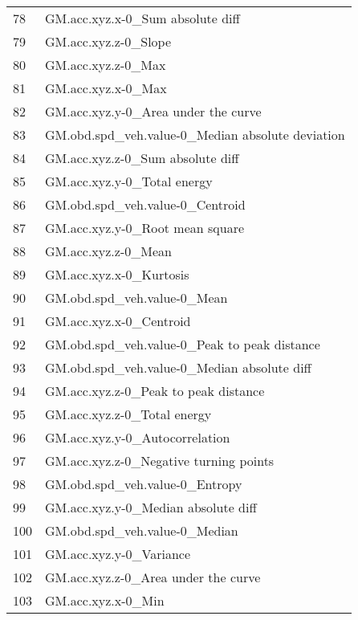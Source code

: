 \begin{tabular}{ll}
78  &                  GM.acc.xyz.x-0\_Sum absolute diff \\
79  &                              GM.acc.xyz.z-0\_Slope \\
80  &                                GM.acc.xyz.z-0\_Max \\
81  &                                GM.acc.xyz.x-0\_Max \\
82  &               GM.acc.xyz.y-0\_Area under the curve \\
83  &  GM.obd.spd\_veh.value-0\_Median absolute deviation \\
84  &                  GM.acc.xyz.z-0\_Sum absolute diff \\
85  &                       GM.acc.xyz.y-0\_Total energy \\
86  &                   GM.obd.spd\_veh.value-0\_Centroid \\
87  &                   GM.acc.xyz.y-0\_Root mean square \\
88  &                               GM.acc.xyz.z-0\_Mean \\
89  &                           GM.acc.xyz.x-0\_Kurtosis \\
90  &                       GM.obd.spd\_veh.value-0\_Mean \\
91  &                           GM.acc.xyz.x-0\_Centroid \\
92  &      GM.obd.spd\_veh.value-0\_Peak to peak distance \\
93  &       GM.obd.spd\_veh.value-0\_Median absolute diff \\
94  &              GM.acc.xyz.z-0\_Peak to peak distance \\
95  &                       GM.acc.xyz.z-0\_Total energy \\
96  &                    GM.acc.xyz.y-0\_Autocorrelation \\
97  &            GM.acc.xyz.z-0\_Negative turning points \\
98  &                    GM.obd.spd\_veh.value-0\_Entropy \\
99  &               GM.acc.xyz.y-0\_Median absolute diff \\
100 &                     GM.obd.spd\_veh.value-0\_Median \\
101 &                           GM.acc.xyz.y-0\_Variance \\
102 &               GM.acc.xyz.z-0\_Area under the curve \\
103 &                                GM.acc.xyz.x-0\_Min \\

\end{tabular}

